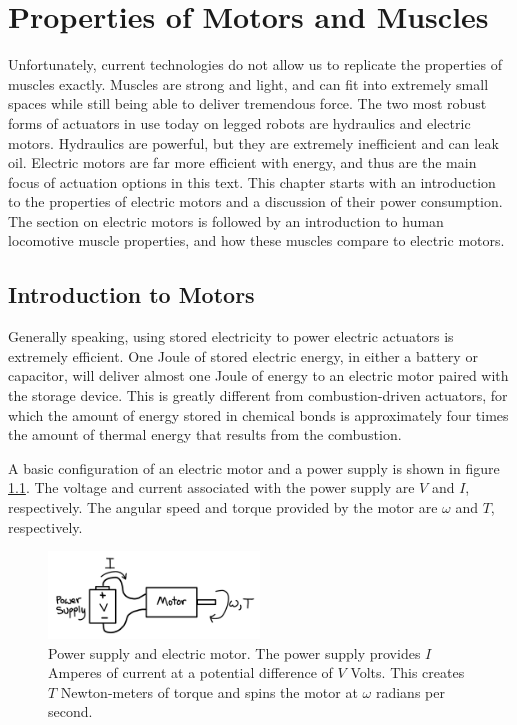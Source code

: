 
\chapter{Properties of Motors and Muscles}
\label{sec:PropertiesOfMotorsAndMuscles}

Unfortunately, current technologies do not allow us to replicate the properties of muscles exactly. Muscles are strong and light, and can fit into extremely small spaces while still being able to deliver tremendous force. The two most robust forms of actuators in use today on legged robots are hydraulics and electric motors. Hydraulics are powerful, but they are extremely inefficient and can leak oil. Electric motors are far more efficient with energy, and thus are the main focus of actuation options in this text. This chapter starts with an introduction to the properties of electric motors and a discussion of their power consumption. The section on electric motors is followed by an introduction to human locomotive muscle properties, and how these muscles compare to electric motors.

\section{Introduction to Motors} %
\label{IntroductionToMotors}

Generally speaking, using stored electricity to power electric actuators is extremely efficient. One Joule of stored electric energy, in either a battery or capacitor, will deliver almost one Joule of energy to an electric motor paired with the storage device. This is greatly different from combustion-driven actuators, for which the amount of energy stored in chemical bonds is approximately four times the amount of thermal energy that results from the combustion.

A basic configuration of an electric motor and a power supply is shown in figure \ref{fig:PowerSupplyAndMotor}. The voltage and current associated with the power supply are $V$ and $I$, respectively. The angular speed and torque provided by the motor are $\omega$ and $T$, respectively.

\begin{figure}[h]		%
\begin{centering}
\includegraphics[width=0.5\textwidth]{Figures/PowerSupplyAndMotor}\par
\end{centering}
\caption[Diagram: Power Supply and Electric Motor]{Power supply and electric motor. The power supply provides $I$ Amperes of current at a potential difference of $V$ Volts. This creates $T$ Newton-meters of torque and spins the motor at $\omega$ radians per second.}
\label{fig:PowerSupplyAndMotor}
\end{figure}
%

